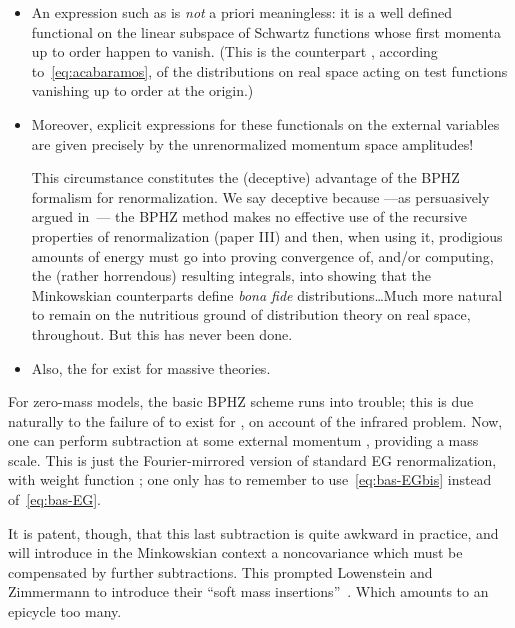 \documentclass[a4paper,12pt]{article}
\renewcommand{\a}{\alpha}          %
\providecommand{\del}{\partial}        %
\renewcommand{\SS}{\mathcal{S}}    %
\providecommand{\7}{\dagger}           %
\theoremstyle{plain}
\theoremstyle{definition}
\begin{document}
\begin{itemize}
\item
An expression such as \coordHE{} is \textit{not} a priori meaningless: it
is a well defined functional on the linear subspace of Schwartz
functions \myHighlight{$\phi$}\coordHE{} whose first momenta \myHighlight{$\int p^\a\phi(p)\,d^d p$}\coordHE{} up to
order \coordHE{} happen to vanish. (This is the counterpart \myHighlight{$F\SS_{k+1}$}\coordHE{},
according to~\eqref{eq:acabaramos}, of the distributions on real space
acting on test functions vanishing up to order \coordHE{} at the origin.)

\item
Moreover, explicit expressions for these functionals on the external
variables are given precisely by the unrenormalized momentum space
amplitudes!

This circumstance constitutes the (deceptive) advantage of the BPHZ
formalism for renormalization. We say deceptive because ---as
persuasively argued in~\cite{ThreefromRussia}--- the BPHZ method makes
no effective use of the recursive properties of renormalization (paper
III) and then, when using it, prodigious amounts of energy must go
into proving convergence of, and/or computing, the (rather horrendous)
resulting integrals, into showing that the Minkowskian counterparts
define \textit{bona fide} distributions\dots Much more natural to
remain on the nutritious ground of distribution theory on real space,
throughout. But this has never been done.

\item
Also, the \myHighlight{$\del^\mu F[f](0)$}\coordHE{} for \coordHE{} exist for massive
theories.
\end{itemize}

For zero-mass models, the basic BPHZ scheme runs into trouble; this is
due naturally to the failure of \myHighlight{$\del^\mu\hat f(0)$}\coordHE{} to exist for
\coordHE{}, on account of the infrared problem. Now, one can perform
subtraction at some external momentum \coordHE{}, providing a mass
scale. This is just the Fourier-mirrored version of standard EG
renormalization, with weight function \coordHE{}; one only has to
remember to use~\eqref{eq:bas-EGbis} instead of~\eqref{eq:bas-EG}.

It is patent, though, that this last subtraction is quite awkward in
practice, and will introduce in the Minkowskian context a
noncovariance which must be compensated by further subtractions. This
prompted Lowenstein and Zimmermann to introduce their ``soft mass
insertions''~\cite{LowZim}. Which amounts to an epicycle too many.
\end{document}
